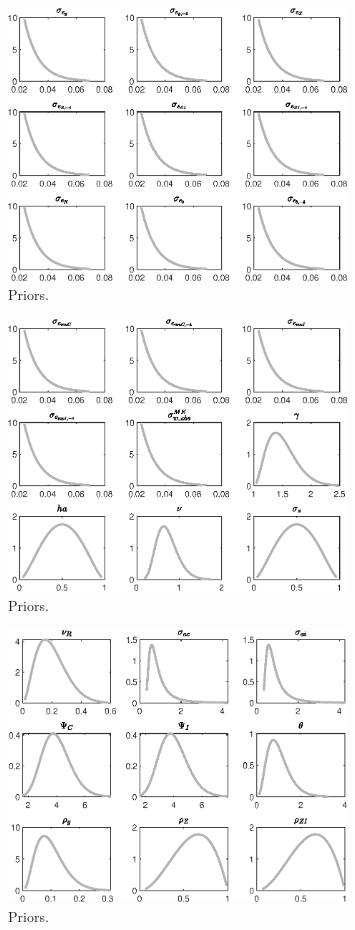 
\begin{figure}[H]
\centering
\includegraphics[width=0.80\textwidth]{RBC_sectoral/graphs/RBC_sectoral_Priors1}
\caption{Priors.}\label{Fig:Priors:1}
\end{figure}
\begin{figure}[H]
\centering
\includegraphics[width=0.80\textwidth]{RBC_sectoral/graphs/RBC_sectoral_Priors2}
\caption{Priors.}\label{Fig:Priors:2}
\end{figure}
\begin{figure}[H]
\centering
\includegraphics[width=0.80\textwidth]{RBC_sectoral/graphs/RBC_sectoral_Priors3}
\caption{Priors.}\label{Fig:Priors:3}
\end{figure}

